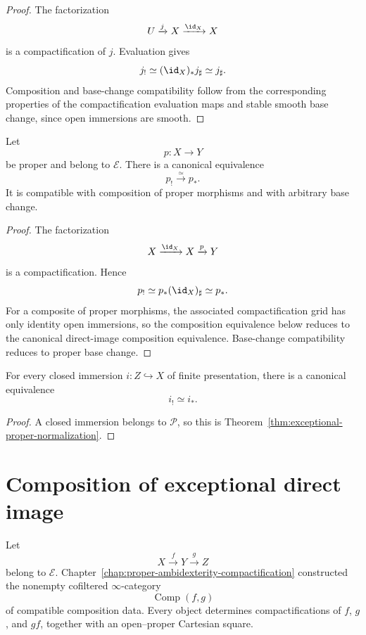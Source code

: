 \begin{proof}
The factorization
\[
    U\xrightarrow{j}X\xrightarrow{\id_X}X
\]
is a compactification of \(j\).  Evaluation gives
\[
    j_!
    \simeq
    (\id_X)_*j_\sharp
    \simeq
    j_\sharp.
\]
Composition and base-change compatibility follow from the corresponding
properties of the compactification evaluation maps and stable smooth base
change, since open immersions are smooth.
\end{proof}

\begin{theorem}
\label{thm:exceptional-proper-normalization}
Let
\[
    p:X\longrightarrow Y
\]
be proper and belong to \(\mathcal E\).  There is a canonical equivalence
\[
    p_!
    \xrightarrow{\simeq}
    p_*.
\]
It is compatible with composition of proper morphisms and with arbitrary
base change.
\end{theorem}

\begin{proof}
The factorization
\[
    X\xrightarrow{\id_X}X\xrightarrow{p}Y
\]
is a compactification.  Hence
\[
    p_!
    \simeq
    p_*(\id_X)_\sharp
    \simeq
    p_*.
\]
For a composite of proper morphisms, the associated compactification grid
has only identity open immersions, so the composition equivalence below
reduces to the canonical direct-image composition equivalence.  Base-change
compatibility reduces to proper base change.
\end{proof}

\begin{corollary}
\label{cor:exceptional-closed-normalization}
For every closed immersion \(i:Z\hookrightarrow X\) of finite presentation,
there is a canonical equivalence
\[
    i_!\simeq i_*.
\]
\end{corollary}

\begin{proof}
A closed immersion belongs to \(\mathcal P\), so this is
Theorem~\ref{thm:exceptional-proper-normalization}.
\end{proof}

\section{Composition of exceptional direct image}
\label{sec:exceptional-composition}

Let
\[
    X\xrightarrow{f}Y\xrightarrow{g}Z
\]
belong to \(\mathcal E\).  Chapter~\ref{chap:proper-ambidexterity-compactification}
constructed the nonempty cofiltered \(\infty\)-category
\[
    \operatorname{Comp}(f,g)
\]
of compatible composition data.  Every object determines
compactifications of \(f\), \(g\), and \(gf\), together with an
open--proper Cartesian square.

